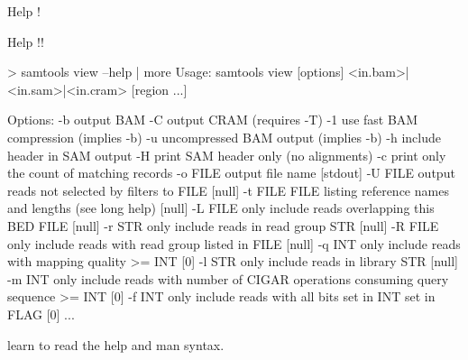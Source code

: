 \documentclass[pdf]{beamer}
\begin{document}
\begin{frame}[fragile]{Help !}
\end{frame}

\begin{frame}[fragile]{Help !!}
    \begin{consolecode}
      > samtools view --help | more
      Usage: samtools view [options] <in.bam>|<in.sam>|<in.cram> [region ...]

      Options:
      -b       output BAM
      -C       output CRAM (requires -T)
      -1       use fast BAM compression (implies -b)
      -u       uncompressed BAM output (implies -b)
      -h       include header in SAM output
      -H       print SAM header only (no alignments)
      -c       print only the count of matching records
      -o FILE  output file name [stdout]
      -U FILE  output reads not selected by filters to FILE [null]
      -t FILE  FILE listing reference names and lengths (see long help) [null]
      -L FILE  only include reads overlapping this BED FILE [null]
      -r STR   only include reads in read group STR [null]
      -R FILE  only include reads with read group listed in FILE [null]
      -q INT   only include reads with mapping quality >= INT [0]
      -l STR   only include reads in library STR [null]
      -m INT   only include reads with number of CIGAR operations consuming
      query sequence >= INT [0]
      -f INT   only include reads with all bits set in INT set in FLAG [0]
      ...
    \end{consolecode}
    
    learn to read the help and man syntax.
\end{frame}
\end{document}
